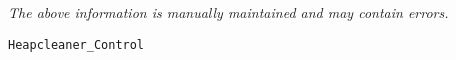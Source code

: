 \label{pkg:heapcleaner\_control}

{\tiny \it The above information is manually maintained and may contain errors.}
\begin{verbatim}
Heapcleaner_Control
\end{verbatim}

